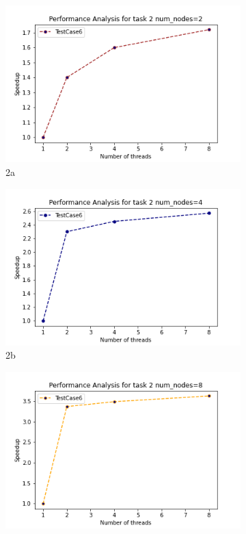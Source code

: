 \documentclass{article}
\begin{document}
\begin{figure}[H]
\begin{subfigure}{.5\textwidth}
  \centering
  \includegraphics[width=.8\linewidth]{Assignment2/report/2nodes=2.png}
  \caption{2a}
  \label{fig:sfig1}
\end{subfigure}%
\begin{subfigure}{.5\textwidth}
  \centering
  \includegraphics[width=.8\linewidth]{Assignment2/report/2nodes=4.png}
  \caption{2b}
  \label{fig:sfig2}
\end{subfigure}
\begin{subfigure}{.5\textwidth}
  \centering
  \includegraphics[width=.8\linewidth]{Assignment2/report/2nodes=8.png}

\end{subfigure}
\end{figure}
\end{document}

